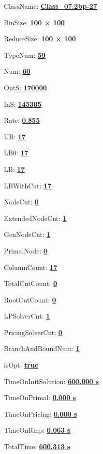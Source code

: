 \documentclass[11pt]{article}
\begin{document}
\pagestyle{empty}


ClassName: \underline{\textbf{Class_07.2bp-27}}
\par
BinSize: \underline{\textbf{100 × 100}}
\par
ReduceSize: \underline{\textbf{100 × 100}}
\par
TypeNum: \underline{\textbf{59}}
\par
Num: \underline{\textbf{60}}
\par
OutS: \underline{\textbf{170000}}
\par
InS: \underline{\textbf{145305}}
\par
Rate: \underline{\textbf{0.855}}
\par
UB: \underline{\textbf{17}}
\par
LB0: \underline{\textbf{17}}
\par
LB: \underline{\textbf{17}}
\par
LBWithCut: \underline{\textbf{17}}
\par
NodeCut: \underline{\textbf{0}}
\par
ExtendedNodeCnt: \underline{\textbf{1}}
\par
GenNodeCnt: \underline{\textbf{1}}
\par
PrimalNode: \underline{\textbf{0}}
\par
ColumnCount: \underline{\textbf{17}}
\par
TotalCutCount: \underline{\textbf{0}}
\par
RootCutCount: \underline{\textbf{0}}
\par
LPSolverCnt: \underline{\textbf{1}}
\par
PricingSolverCnt: \underline{\textbf{0}}
\par
BranchAndBoundNum: \underline{\textbf{1}}
\par
isOpt: \underline{\textbf{true}}
\par
TimeOnInitSolution: \underline{\textbf{600.000 s}}
\par
TimeOnPrimal: \underline{\textbf{0.000 s}}
\par
TimeOnPricing: \underline{\textbf{0.000 s}}
\par
TimeOnRmp: \underline{\textbf{0.063 s}}
\par
TotalTime: \underline{\textbf{600.313 s}}
\par
\newpage


\end{document}
